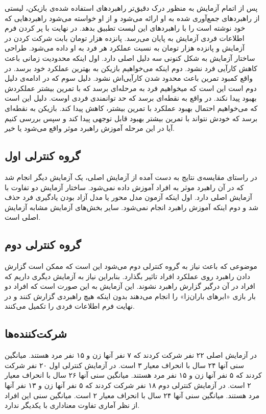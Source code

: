 \documentclass[twoside, a4paper,11pt]{book}
\numberwithin{equation}{chapter}
\numberwithin{table}{chapter}
\numberwithin{figure}{chapter}
\numberwithin{equation}{chapter}
\begin{document}
پس از اتمام آزمایش به منظور درک دقیق‌تر راهبردهای استفاده شده‌ی بازیکن، لیستی از راهبردهای جمع‌آوری شده به او ارائه می‌شود و از او خواسته می‌شود راهبردهایی که خود نوشته است را با راهبردهای این لیست تطبیق بدهد. در نهایت با پر کردن فرم اطلاعات فردی آزمایش به پایان می‌رسد. پانزده هزار تومان بابت شرکت کردن در آزمایش و پانزده هزار تومان به نسبت عملکرد هر فرد به او داده می‌شود.
طراحی ساختار آزمایش به شکل کنونی سه دلیل اصلی دارد. اول اینکه محدودیت زمانی باعث کاهش کارآیی فرد نشود. دوم اینکه می‌خواهیم بازیکن به بهترین عملکرد خود برسد. در واقع کمبود تمرین باعث محدود شدن کارآیی‌اش نشود. دلیل سوم که در ادامه‌ی دلیل دوم است این است که میخواهیم فرد به مرحله‌ای برسد که با تمرین بیشتر عملکردش بهبود پیدا نکند. در واقع به نقطه‌ای برسد که حد توانمندی فردی اوست. دلیل این است که می‌خواهیم احتمال بهبود عملکرد با تمرین بیشتر، کاهش پیدا کند. بازیکن به نقطه‌ای برسد که خودش نتواند با تمرین بیشتر بهبود قابل توجهی پیدا کند و سپس بررسی کنیم آیا در این مرحله آموزش راهبرد موثر واقع می‌شود یا خیر.

\subsection{گروه کنترلی اول}

در راستای مقایسه‌ی نتایج به دست آمده از آزمایش اصلی، یک آزمایش دیگر انجام شد که در آن راهبرد موثر به افراد آموزش داده نمی‌شود. ساختار آزمایش دو تفاوت با آزمایش اصلی دارد. اول اینکه آزمون مدل محور یا مدل آزاد بودن یادگیری فرد حذف شد و دوم اینکه آموزش راهبرد انجام نمی‌شود. سایر بخش‌های آزمایش مشابه آزمایش اصلی است.

\subsection{گروه کنترلی دوم}

موضوعی که باعث نیاز به گروه کنترلی دوم می‌شود این است که ممکن است گزارش دادن راهبرد روی عملکرد افراد تاثیر بگذارد. بنابراین نیاز به آزمایش دیگری داریم که افراد در آن درگیر گزارش راهبرد نشوند. این آزمایش به این صورت است که افراد دو بار بازی «ابرهای باران‌زا» را انجام می‌دهند بدون اینکه هیچ راهبردی گزارش کنند و در نهایت فرم اطلاعات فردی را تکمیل می‌کنند.

\subsection{شرکت‌کننده‌ها}

در آزمایش اصلی ۲۲ نفر شرکت کردند که ۷ نفر آنها زن و ۱۵ نفر مرد هستند. میانگین سنی آنها ۲۴ سال با انحراف معیار ۳ است. در آزمایش کنترلی اول ۲۰ نفر شرکت کردند که ۵ نفر آنها زن و ۱۵ نفر مرد هستند. میانگین سنی آنها ۲۶ سال با انحراف معیار ۲ است. در آزمایش کنترلی دوم ۱۸ نفر شرکت کردند که ۵ نفر آنها زن و ۱۳ نفر آنها مرد هستند. میانگین سنی آنها ۲۴ سال با انحراف معیار ۲ است. میانگین سنی این افراد از نظر آماری تفاوت معناداری با یکدیگر ندارد.
\end{document}
